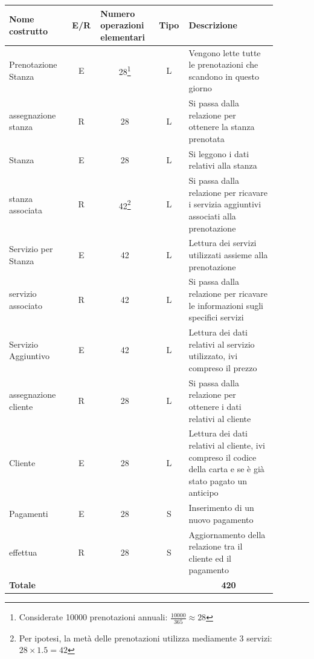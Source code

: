 \documentclass[12pt,a4paper]{article}
\begin{document}
\begin{center}\setlength{\extrarowheight}{1.5pt}\begin{longtable}{|p{0.2\linewidth}|p{0.1\linewidth}|p{0.175\linewidth}|p{0.1\linewidth}|p{0.3\linewidth}|}\hline \textbf{Nome costrutto}   & \multicolumn{1}{|c|}{\textbf{E/R}} & \textbf{Numero operazioni elementari} & \multicolumn{1}{|c|}{\textbf{Tipo}} & \textbf{Descrizione}\\ 
\hline
Prenotazione Stanza
 & 
\multicolumn{1}{|c|}{E}
 & 
\multicolumn{1}{|c|}{28\footnote{Considerate 10000 prenotazioni annuali: $\frac{10000}{365}\approx 28$}}
 & 
\multicolumn{1}{|c|}{L}
 & 
Vengono lette tutte le prenotazioni che scandono in questo giorno
\\
\hline
assegnazione stanza
 & 
\multicolumn{1}{|c|}{R}
 & 
\multicolumn{1}{|c|}{28}
 & 
\multicolumn{1}{|c|}{L}
 & 
Si passa dalla relazione per ottenere la stanza prenotata
\\
\hline
Stanza
 & 
\multicolumn{1}{|c|}{E}
 & 
\multicolumn{1}{|c|}{28}
 & 
\multicolumn{1}{|c|}{L}
 & 
Si leggono i dati relativi alla stanza
\\
\hline
stanza associata
 & 
\multicolumn{1}{|c|}{R}
 & 
\multicolumn{1}{|c|}{42\footnote{Per ipotesi, la metà delle prenotazioni utilizza mediamente 3 servizi: $28\times 1.5=42$}}
 & 
\multicolumn{1}{|c|}{L}
 & 
Si passa dalla relazione per ricavare i servizia aggiuntivi associati alla prenotazione
\\
\hline
Servizio per Stanza
 & 
\multicolumn{1}{|c|}{E}
 & 
\multicolumn{1}{|c|}{42}
 & 
\multicolumn{1}{|c|}{L}
 & 
Lettura dei servizi utilizzati assieme alla prenotazione
\\
\hline
servizio associato
 & 
\multicolumn{1}{|c|}{R}
 & 
\multicolumn{1}{|c|}{42}
 & 
\multicolumn{1}{|c|}{L}
 & 
Si passa dalla relazione per ricavare le informazioni sugli specifici servizi
\\
\hline
Servizio Aggiuntivo
 & 
\multicolumn{1}{|c|}{E}
 & 
\multicolumn{1}{|c|}{42}
 & 
\multicolumn{1}{|c|}{L}
 & 
Lettura dei dati relativi al servizio utilizzato, ivi compreso il prezzo
\\
\hline
assegnazione cliente
 & 
\multicolumn{1}{|c|}{R}
 & 
\multicolumn{1}{|c|}{28}
 & 
\multicolumn{1}{|c|}{L}
 & 
Si passa dalla relazione per ottenere i dati relativi al cliente
\\
\hline
Cliente
 & 
\multicolumn{1}{|c|}{E}
 & 
\multicolumn{1}{|c|}{28}
 & 
\multicolumn{1}{|c|}{L}
 & 
Lettura dei dati relativi al cliente, ivi compreso il codice della carta e se è già stato pagato un anticipo
\\
\hline
Pagamenti
 & 
\multicolumn{1}{|c|}{E}
 & 
\multicolumn{1}{|c|}{28}
 & 
\multicolumn{1}{|c|}{S}
 & 
Inserimento di un nuovo pagamento
\\
\hline
effettua
 & 
\multicolumn{1}{|c|}{R}
 & 
\multicolumn{1}{|c|}{28}
 & 
\multicolumn{1}{|c|}{S}
 & 
Aggiornamento della relazione tra il cliente ed il pagamento
\\
\hline
\multicolumn{4}{|l|}{\textbf{Totale}}
 & 
\multicolumn{1}{|c|}{\textbf{420}}
\\
\hline
\end{longtable}\end{center}
\end{document}
